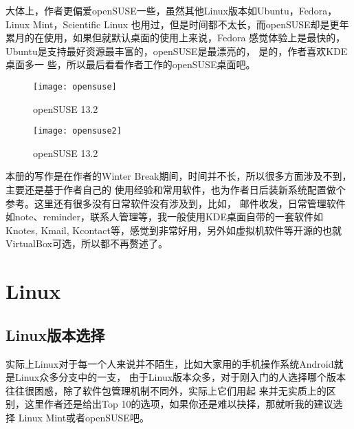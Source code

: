 \documentclass[11pt,fleqn]{book} %
\begin{document}
大体上，作者更偏爱openSUSE一些，虽然其他Linux版本如Ubuntu，Fedora，Linux Mint，Scientific Linux 
也用过，但是时间都不太长，而openSUSE却是更年累月的在使用，如果但就默认桌面的使用上来说，Fedora
感觉体验上是最快的，Ubuntu是支持最好资源最丰富的，openSUSE是最漂亮的， 是的，作者喜欢KDE桌面多一
些，所以最后看看作者工作的openSUSE桌面吧\faSmileO。

\begin{figure}[!ht]
  \centering
  \texttt{[image: opensuse]}
  \caption{openSUSE 13.2}
  \label{fig:opensuse1}
\end{figure}

\begin{figure}[!h]
  \centering
  \texttt{[image: opensuse2]}
  \caption{openSUSE 13.2}
  \label{fig:oepnsuse2}
\end{figure}

\begin{tips}
本册的写作是在作者的Winter Break期间，时间并不长，所以很多方面涉及不到，主要还是基于作者自己的
使用经验和常用软件，也为作者日后装新系统配置做个参考。这里还有很多没有日常软件没有涉及到，比如，
邮件收发，日常管理软件如note、reminder，联系人管理等，我一般使用KDE桌面自带的一套软件如Knotes,
Kmail, Kcontact等，感觉到非常好用，另外如虚拟机软件等开源的也就VirtualBox可选，所以都不再赘述了。
\end{tips}


\chapter{Linux \texorpdfstring{\faLinux}{world}}

\section{Linux版本选择}

实际上Linux对于每一个人来说并不陌生，比如大家用的手机操作系统Android就是Linux众多分支中的一支，
由于Linux版本众多，对于刚入门的人选择哪个版本往往很困惑，除了软件包管理机制不同外，实际上它们用起
来并无实质上的区别，这里作者还是给出Top 10的选项，如果你还是难以抉择，那就听我的建议选择
Linux Mint或者openSUSE吧。
\end{document}
